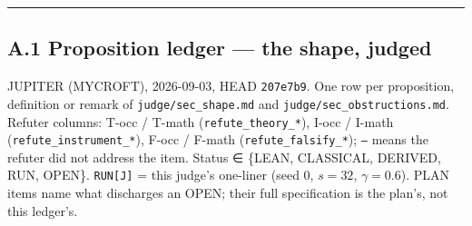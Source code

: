 \documentclass[11pt,a4paper]{article}
\theoremstyle{plain}
\theoremstyle{definition}
\theoremstyle{remark}
\begin{document}
\begin{center}\rule{0.5\linewidth}{0.5pt}\end{center}

\subsection{A.1 Proposition ledger --- the shape,
judged}\label{a.1-proposition-ledger-the-shape-judged}

JUPITER (MYCROFT), 2026-09-03, HEAD \texttt{207e7b9}. One row per
proposition, definition or remark of \texttt{judge/sec\_shape.md} and
\texttt{judge/sec\_obstructions.md}. Refuter columns: T-occ / T-math
(\texttt{refute\_theory\_*}), I-occ / I-math
(\texttt{refute\_instrument\_*}), F-occ / F-math
(\texttt{refute\_falsify\_*}); \texttt{—} means the refuter did not
address the item. Status ∈ \{LEAN, CLASSICAL, DERIVED, RUN, OPEN\}.
\texttt{RUN{[}J{]}} = this judge's one-liner (seed 0, \(s=32\),
\(\gamma=0.6\)). PLAN items name what discharges an OPEN; their full
specification is the plan's, not this ledger's.
\end{document}

